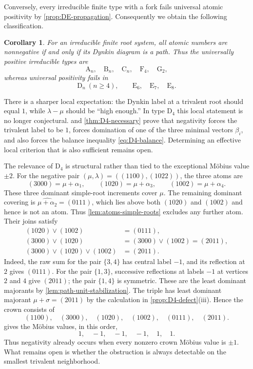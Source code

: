 \documentclass[11pt]{article}
\newtheorem{corollary}[corollary]{Corollary}
\theoremstyle{definition}
\theoremstyle{remark}
\newcommand{\typeA}{\ensuremath{\mathrm{A}}}
\newcommand{\typeB}{\ensuremath{\mathrm{B}}}
\newcommand{\typeC}{\ensuremath{\mathrm{C}}}
\newcommand{\typeD}{\ensuremath{\mathrm{D}}}
\newcommand{\typeE}{\ensuremath{\mathrm{E}}}
\newcommand{\typeF}{\ensuremath{\mathrm{F}}}
\newcommand{\typeG}{\ensuremath{\mathrm{G}}}
\begin{document}
Conversely, every irreducible finite type with a fork fails universal atomic
positivity by \cref{prop:DE-propagation}.  Consequently we obtain the following
classification.

\begin{corollary}
\label{cor:universal-path-classification}
For an irreducible finite root system, all atomic numbers are nonnegative if
and only if its Dynkin diagram is a path.  Thus the universally
positive irreducible types are
\[
       \typeA_n,\quad \typeB_n,\quad \typeC_n,\quad \typeF_4,
       \quad \typeG_2,
\]
whereas universal positivity fails in
\[
       \typeD_n\ (n\ge4),\qquad \typeE_6,\quad \typeE_7,\quad \typeE_8.
\]
\end{corollary}

There is a sharper local expectation: the Dynkin label at a trivalent root
should equal $1$, while $\lambda-\mu$ should be ``high enough.''  In type
$\typeD_4$ this local statement is no longer conjectural.  
and \cref{thm:D4-necessary} prove that negativity forces the
trivalent label to be $1$, forces domination of one of the three minimal
vectors $\beta_i$, and also forces the balance inequality
\eqref{eq:D4-balance}.  Determining an effective local criterion that is also
sufficient remains open.

The relevance of $\typeD_4$ is structural rather than tied to the exceptional
M\"obius value $\pm2$.  For the negative pair
$(\mu,\lambda)=((1100),(1022))$, the three atoms are
\[
 (3000)=\mu+\alpha_1,\qquad
 (1020)=\mu+\alpha_3,\qquad
 (1002)=\mu+\alpha_4.
\]
These three dominant simple-root increments cover $\mu$.  The remaining
dominant covering is $\widehat{\mu+\alpha_2}=(0111)$, which lies above both
$(1020)$ and $(1002)$ and hence is not an atom.  Thus
\cref{lem:atoms-simple-roots} excludes any further atom.
Their joins satisfy
\begin{align*}
 (1020)\vee(1002)&=(0111),\\
 (3000)\vee(1020)&=(3000)\vee(1002)=(2011),\\
 (3000)\vee(1020)\vee(1002)&=(2011).
\end{align*}
Indeed, the raw sum for the pair $\{3,4\}$ has central label $-1$, and its
reflection at $2$ gives $(0111)$.  For the pair $\{1,3\}$, successive
reflections at labels $-1$ at vertices $2$ and $4$ give $(2011)$; the pair
$\{1,4\}$ is symmetric.  These are the least dominant majorants by
\cref{lem:path-unit-stabilization}.  The triple has least dominant majorant
$\mu+\sigma=(2011)$ by the calculation in \cref{prop:D4-defect}(iii).
Hence the crown consists of
\[
 (1100),\quad(3000),\quad(1020),\quad(1002),\quad(0111),\quad(2011).
\]
 gives the M\"obius values, in this order,
\[
 1,\quad -1,\quad -1,\quad -1,\quad 1,\quad 1.
\]
Thus negativity already occurs when every nonzero crown M\"obius value is
$\pm1$.  What remains open is whether the obstruction is always detectable on
the smallest trivalent neighborhood.
\end{document}
